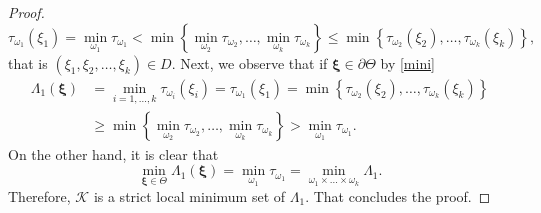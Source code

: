 \documentclass[11pt,a4paper]{amsart}
\theoremstyle{definition}
\renewcommand{\(}{\left(}
\renewcommand{\)}{\right)}
\begin{document}
\begin{proof}
$$\tau_{\omega_1}(\xi_1)=\min\limits_{\omega_1}\tau_{\omega_1}<\min\left\{\min\limits_{\omega_2}\tau_{\omega_2},\dots,\min\limits_{\omega_{k}}\tau_{\omega_k}\right\} \leq  \min\left\{\tau_{\omega_2}(\xi_2),\dots,\tau_{\omega_k}(\xi_k)\right\},$$
that is $(\xi_1,\xi_2,\dots,\xi_k)\in D.$
Next, we  observe that if $\boldsymbol\xi\in\partial \Theta$ by \eqref{mini}
$$\begin{aligned}\Lambda_1(\boldsymbol\xi)&= \min\limits_{i=1,\dots,k} \tau_{\omega_i}(\xi_i)=\tau_{\omega_1}(\xi_1)= \min\left\{\tau_{\omega_2}(\xi_2),\dots,\tau_{\omega_k}(\xi_k)\right\}\\
& \geq \min\left\{\min\limits_{\omega_2}\tau_{\omega_2},\dots,\min\limits_{\omega_{k}}\tau_{\omega_k}\right\}>\min\limits_{\omega_1}\tau_{\omega_1}.\end{aligned}$$
On the other hand, it is clear that
$$\min\limits_{\boldsymbol\xi\in  \Theta}\Lambda_1(\boldsymbol\xi)=\min\limits_{\omega_1}\tau_{\omega_1}=\min\limits_{ \omega_1\times\dots\times\omega_k} \Lambda_1.$$
Therefore, $\mathscr K$ is a strict local minimum set of $\Lambda_1$. That concludes the proof.
\end{proof}
\end{document}
